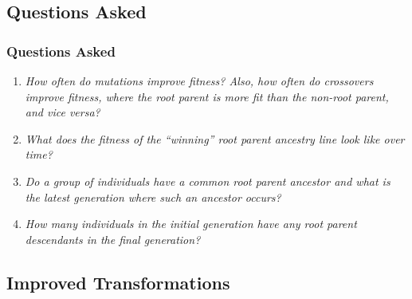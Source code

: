 \documentclass{beamer}
\begin{document}
\subsection[Questions Asked]{Questions Asked}

\begin{frame}
\frametitle{Questions Asked}
\begin{enumerate}
\item \emph{How often do mutations improve fitness? Also, how often do crossovers improve fitness, where the root parent is more fit than the non-root parent, and vice versa?}
\item \emph{What does the fitness of the ``winning'' root parent ancestry line look like over time?}
\item \emph{Do a group of individuals have a common root parent ancestor and what is the latest generation where such an ancestor occurs?}
\item \emph{How many individuals in the initial generation have any root parent descendants in the final generation?}
\end{enumerate}
\end{frame}

\subsection[Improved Transformations]{Improved Transformations}
\end{document}

